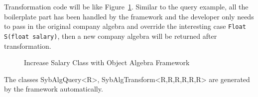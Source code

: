 Transformation code will be like Figure~\ref{transform_with_oaframework}. Similar to the query example, all the boilerplate part has been handled by the framework and the developer only needs to pass in the original company algebra and override the interesting case \lstinline{Float S(float salary)}, then a new company algebra will be returned after transformation.  
\begin{figure}[tb]
\vspace{-.1in}
\caption{Increase Salary Class with Object Algebra Framework}
\label{transform_with_oaframework}
\end{figure}

The classes SybAlgQuery<R>, SybAlgTransform<R,R,R,R,R,R> are generated
by the framework automatically. 
